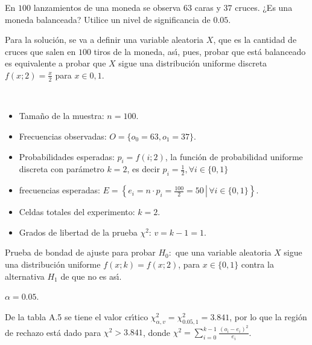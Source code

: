 \begin{enunciado}
 En $100$ lanzamientos de una moneda se observa $63$ caras y $37$ cruces.
 ¿Es una moneda balanceada?
 Utilice un nivel de significancia de $0.05$.
\end{enunciado}

\begin{solucion}
 Para la soluci\'on, se va a definir una variable aleatoria $X$,
 que es la cantidad de cruces que salen en $100$ tiros de la moneda,
 as\'{\i}, pues, probar que est\'a balanceado es equivalente
 a probar que $X$ sigue una distribuci\'on uniforme discreta
 $f(x;2) = \frac{x}{2}$ para $x\in{0,1}$.
 \begin{datos}
  $\phantom{0}$
  \begin{itemize}
   \item Tama\~no de la muestra: $n=100$.
   \item Frecuencias observadas:
   $O = \{ o_0 = 63, o_1 = 37 \}$.
   \item Probabilidades esperadas: $p_i = f(i;2)$,
   la funci\'on de probabilidad uniforme discreta con par\'ametro $k=2$,
   es decir $p_i = \frac{1}{2}, \forall i \in \{0,1\}$
   \item frecuencias esperadas:
   $E = \left\{ \left. e_i = n\cdot p_i = \frac{100}{2} = 50 \, \right| \, \forall i \in \{0,1\} \right\}$.
   \item Celdas totales del experimento: $k=2$.
   \item Grados de libertad de la prueba $\chi^2$: $v = k-1 = 1$.
  \end{itemize}
 \end{datos}

 \begin{hipotesis}
  Prueba de bondad de ajuste para probar $H_0:$
  que una variable aleatoria $X$ sigue una distribuci\'on uniforme
  $f(x;k) = f(x;2)$, para $x\in\{0,1\}$
  contra la alternativa $H_1$ de que no es as\'{\i}.
 \end{hipotesis}

 \begin{significancia}
  $\alpha = 0.05$.
 \end{significancia}

 \begin{region}
  De la tabla A.5 se tiene el valor cr\'{\i}tico
  $\chi^2_{\alpha,v} = \chi^2_{0.05,1} = 3.841$,
  por lo que la regi\'on de rechazo est\'a dado
  para $\chi^2 > 3.841$, donde
  $\chi^2 = \sum_{i=0}^{k-1} \frac{\left( o_i - e_i \right)^2}{e_i}$.
 \end{region}


\end{solucion}
